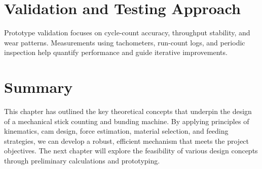 \section{Validation and Testing Approach}
Prototype validation focuses on cycle-count accuracy, throughput stability, and wear patterns. Measurements using tachometers, run-count logs, and periodic inspection help quantify performance and guide iterative improvements.

\section*{Summary}
This chapter has outlined the key theoretical concepts that underpin the design of a mechanical stick counting and bunding machine. By applying principles of kinematics, cam design, force estimation, material selection, and feeding strategies, we can develop a robust, efficient mechanism that meets the project objectives. The next chapter will explore the feasibility of various design concepts through preliminary calculations and prototyping.